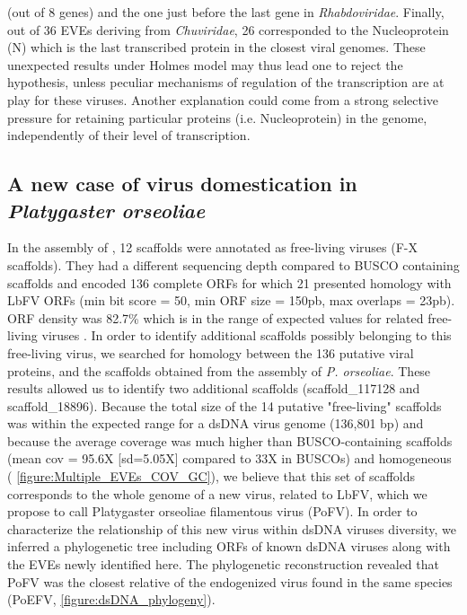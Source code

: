 (out of 8 genes) and the one just before the last gene in \textit{Rhabdoviridae}. Finally, out of 36 EVEs deriving from \textit{Chuviridae}, 26 corresponded to the Nucleoprotein (N) which is the last transcribed protein in the closest viral genomes. These unexpected results under Holmes model may thus lead one to reject the hypothesis, unless peculiar mechanisms of regulation of the transcription are at play for these viruses. Another explanation could come from a strong selective pressure for retaining particular proteins (i.e. Nucleoprotein) in the genome, independently of their level of transcription.

\subsection{A new case of virus domestication in \textit{Platygaster orseoliae}}
\label{sec:SI-2}

In the assembly of , 12 scaffolds were annotated as free-living viruses (F-X scaffolds). They had a different sequencing depth compared to BUSCO containing scaffolds and encoded 136 complete ORFs for which 21 presented homology with LbFV ORFs (min bit score = 50,  min ORF size = 150pb, max overlaps = 23pb). ORF density was 82.7\% which is in the range of expected values for related free-living viruses \citep{bezier_genome_2015}. In order to identify additional scaffolds possibly belonging to this free-living virus, we searched for homology between the 136 putative viral proteins, and the scaffolds obtained from the assembly of \textit{P. orseoliae}. These results allowed us to identify two additional scaffolds (scaffold\_117128 and scaffold\_18896). Because the total size of the 14 putative "free-living" scaffolds was within the expected range for a dsDNA virus genome (136,801 bp) and because the average coverage was much higher than BUSCO-containing scaffolds (mean cov = 95.6X [sd=5.05X] compared to 33X in BUSCOs) and homogeneous (\figurename{ \ref{figure:Multiple_EVEs_COV_GC}}), we believe that this set of scaffolds corresponds to the whole genome of a new virus, related to LbFV, which we propose to call Platygaster orseoliae filamentous virus (PoFV). In order to characterize the relationship of this new virus within dsDNA viruses diversity, we inferred a phylogenetic tree including ORFs of known dsDNA viruses along with the EVEs newly identified here. The phylogenetic reconstruction revealed that PoFV was the closest relative of the endogenized virus found in the same species (PoEFV, \figurename{ \ref{figure:dsDNA_phylogeny}}). 

